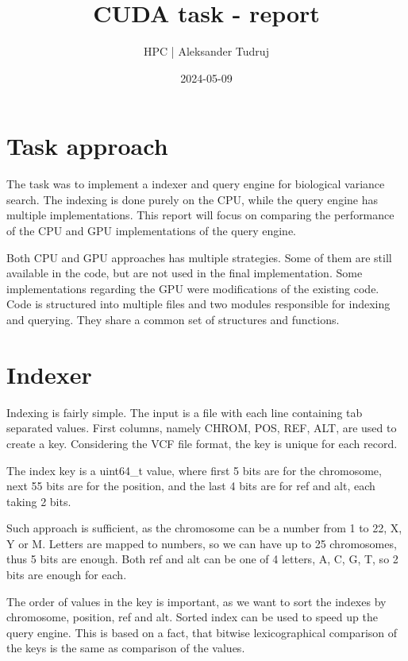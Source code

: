 \documentclass[a4paper,12pt]{article}
\title{ CUDA task - report }
\author{ HPC | Aleksander Tudruj }
\date{ 2024-05-09 }
\begin{document}
    \maketitle

    \tableofcontents
    \newpage


    \section{Task approach}

    The task was to implement a indexer and query engine for biological variance search.
    The indexing is done purely on the CPU, while the query engine has multiple implementations.
    This report will focus on comparing the performance of the CPU and GPU implementations of the query engine.

    Both CPU and GPU approaches has multiple strategies. Some of them are still
    available in the code, but are not used in the final implementation.
    Some implementations regarding the GPU were modifications of the existing code.
    Code is structured into multiple files and two modules responsible for indexing and querying.
    They share a common set of structures and functions.


    \section{Indexer}
    Indexing is fairly simple. The input is a file with each line containing tab separated values.
    First columns, namely CHROM, POS, REF, ALT, are used to create a key.
    Considering the VCF file format, the key is unique for each record.

    The index key is a uint64\_t value, where first
    5 bits are for the chromosome, next 55 bits are for the position,
    and the last 4 bits are for ref and alt, each taking 2 bits.

    Such approach is sufficient, as the chromosome can be a number from 1 to 22, X, Y or M.
    Letters are mapped to numbers, so we can have up to 25 chromosomes, thus 5 bits are enough.
    Both ref and alt can be one of 4 letters, A, C, G, T, so 2 bits are enough for each.

    The order of values in the key is important, as we want to sort the indexes by chromosome, position, ref and alt.
    Sorted index can be used to speed up the query engine.
    This is based on a fact, that bitwise lexicographical comparison of the keys is the same as comparison of the values.
\end{document}
